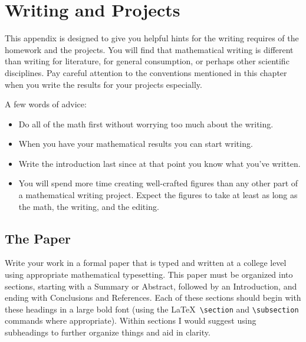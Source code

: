 \chapter{Writing and Projects}\label{app:writing_projects}
This appendix is designed to give you helpful hints for the writing requires of the
homework and the projects.  You will find that mathematical writing is different than
writing for literature, for general consumption, or perhaps other scientific disciplines.
Pay careful attention to the conventions mentioned in this chapter when you write the
results for your projects especially.  

A few words of advice:
\begin{itemize}
    \item Do all of the math first without worrying too much about the writing.  
    \item When you have your mathematical results you can start writing.
    \item Write the introduction last since at that point you know what you've written.
    \item You will spend more time creating well-crafted figures than any other part of a
        mathematical writing project.  Expect the figures to take at least as long
        as the math, the writing, and the editing.
\end{itemize}

\section{The Paper} 
Write your work in a formal paper that is typed and written at a college level using
appropriate mathematical typesetting. This paper must be organized into sections, starting
with a Summary or Abstract, followed by an Introduction, and ending with Conclusions and
References. Each of these sections should begin with these headings in a large bold font
(using the \LaTeX\ \verb|\section| and \verb|\subsection| commands where appropriate).
Within sections I would suggest using subheadings to further organize things and aid in
clarity.

